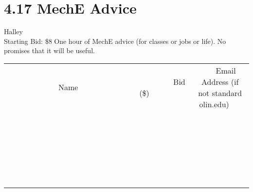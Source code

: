 \documentclass[11pt]{article}
\begin{document}
\section*{4.17 MechE Advice}
Halley
\\
Starting Bid: \$8
\newline
One hour of MechE advice (for classes or jobs or life). No promises that it will be useful.
\\[6ex]
\begin{tabular}{c c c}
~~~~~~~~~~~~~Name~~~~~~~~~~~~~ & ~~~~~~~~~Bid (\$)~~~~~~~~~  & ~~~Email Address (if not standard olin.edu)~~~\\
 & & \\
\hline
 & & \\
\hline
 & & \\
\hline
 & & \\
\hline
 & & \\
\hline
 & & \\
\hline
 & & \\
\hline
 & & \\
\hline
 & & \\
\hline
 & & \\
\hline
 & & \\
\hline
 & & \\
\hline
 & & \\
\hline
 & & \\
\hline
 & & \\
\hline
 & & \\
\hline
 & & \\
\hline
 & & \\
\hline
 & & \\
\hline
 & & \\
\hline
 & & \\
\hline
 & & \\
\hline
 & & \\
\hline
 & & \\
\hline
 & & \\
\hline
 & & \\
\hline
\end{tabular}
\newpage
\end{document}
